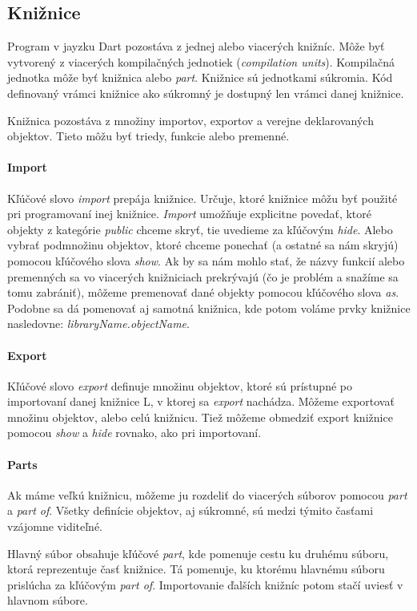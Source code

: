\subsection{Knižnice}
Program v jayzku Dart pozostáva z jednej alebo viacerých knižníc. Môže byť vytvorený z viacerých kompilačných jednotiek (\emph{compilation units}). Kompilačná jednotka môže byť knižnica alebo \emph{part}.
Knižnice sú jednotkami súkromia. Kód definovaný vrámci knižnice ako súkromný je dostupný len vrámci danej knižnice.

Knižnica pozostáva z množiny importov, exportov a verejne deklarovaných objektov. Tieto môžu byť triedy, funkcie alebo premenné.

\paragraph{Import}
Kľúčové slovo \emph{import} prepája knižnice. Určuje, ktoré knižnice môžu byť použité pri programovaní inej knižnice. 
\emph{Import} umožňuje explicitne povedať, ktoré objekty z kategórie \emph{public} chceme skryť, tie uvedieme za kľúčovým \emph{hide}. 
Alebo vybrať podmnožinu objektov, ktoré chceme ponechať (a ostatné sa nám skryjú) pomocou kľúčového slova \emph{show}.
Ak by sa nám mohlo stať, že názvy funkcií alebo premenných sa vo viacerých knižniciach prekrývajú (čo je problém a snažíme sa tomu zabrániť), môžeme premenovať dané objekty pomocou kľúčového slova \emph{as}. 
Podobne sa dá pomenovať aj samotná knižnica, kde potom voláme prvky knižnice nasledovne: \emph{libraryName.objectName}.

\paragraph{Export}
Kľúčové slovo \emph{export} definuje množinu objektov, ktoré sú prístupné po importovaní danej knižnice L, v ktorej sa \emph{export} nachádza. 
Môžeme exportovať množinu objektov, alebo celú knižnicu. 
Tiež môžeme obmedziť export knižnice pomocou \emph{show} a \emph{hide} rovnako, ako pri importovaní.

\paragraph{Parts}
Ak máme veľkú knižnicu, môžeme ju rozdeliť do viacerých súborov pomocou \emph{part} a \emph{part of}. 
Všetky definície objektov, aj súkromné, sú medzi týmito časťami vzájomne viditeľné.

Hlavný súbor obsahuje kľúčové \emph{part}, kde pomenuje cestu ku druhému súboru, ktorá reprezentuje časť knižnice. Tá pomenuje, ku ktorému hlavnému súboru prislúcha za kľúčovým \emph{part of}.
Importovanie ďalších knižníc potom stačí uviesť v hlavnom súbore.

